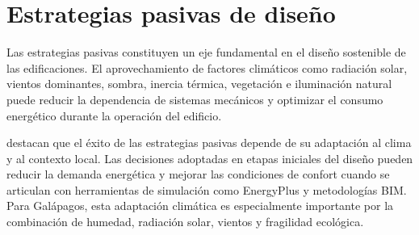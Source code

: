 \section{Estrategias pasivas de diseño}

\begin{textoDosTercios}

Las estrategias pasivas constituyen un eje fundamental en el diseño sostenible de las edificaciones. El aprovechamiento de factores climáticos como radiación solar, vientos dominantes, sombra, inercia térmica, vegetación e iluminación natural puede reducir la dependencia de sistemas mecánicos y optimizar el consumo energético durante la operación del edificio.

\textcite{maghamiNetZeroEnergy2025} destacan que el éxito de las estrategias pasivas depende de su adaptación al clima y al contexto local. Las decisiones adoptadas en etapas iniciales del diseño pueden reducir la demanda energética y mejorar las condiciones de confort cuando se articulan con herramientas de simulación como EnergyPlus y metodologías BIM. Para Galápagos, esta adaptación climática es especialmente importante por la combinación de humedad, radiación solar, vientos y fragilidad ecológica.

\end{textoDosTercios}

